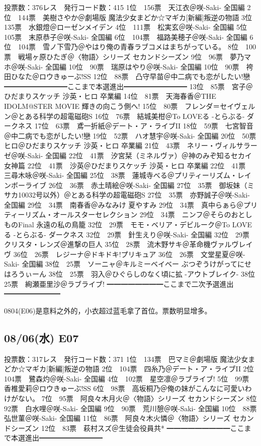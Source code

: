 	投票数：376レス　発行コード数：415
	1位　156票　天江衣＠咲-Saki- 全国編
	2位　144票　美樹さやか＠劇場版 魔法少女まどか☆マギカ[新編]叛逆の物語
	3位　135票　水銀燈＠ローゼンメイデン
	4位　111票　松実玄＠咲-Saki- 全国編
	5位　105票　末原恭子＠咲-Saki- 全国編
	6位　104票　福路美穂子＠咲-Saki- 全国編
	6位　104票　雪ノ下雪乃＠やはり俺の青春ラブコメはまちがっている。
	8位　100票　戦場ヶ原ひたぎ＠〈物語〉シリーズ セカンドシーズン
	9位　96票　夢乃マホ＠咲-Saki- 全国編
	10位　90票　瑞原はやり＠咲-Saki- 全国編
	10位　90票　袴田ひなた＠ロウきゅーぶ!SS
	12位　88票　凸守早苗＠中二病でも恋がしたい!戀
	━━━━━━━━━ここまで本選進出━━━━━━━━━
	13位　85票　宮子＠ひだまりスケッチ 沙英・ヒロ 卒業編
	14位　81票　天海春香＠THE IDOLM@STER MOVIE 輝きの向こう側へ!
	15位　80票　フレンダ＝セイヴェルン＠とある科学の超電磁砲S
	16位　76票　結城美柑＠To LOVEる -とらぶる- ダークネス
	17位　63票　鳶一折紙＠デート・ア・ライブII
	18位　59票　七宮智音＠中二病でも恋がしたい!戀
	19位　52票　ハオ慧宇＠咲-Saki- 全国編
	20位　50票　ヒロ＠ひだまりスケッチ 沙英・ヒロ 卒業編
	21位　43票　ネリー・ヴィルサラーゼ＠咲-Saki- 全国編
	22位　41票　汐宮栞（ミネルヴァ）＠神のみぞ知るセカイ 女神篇
	22位　41票　沙英＠ひだまりスケッチ 沙英・ヒロ 卒業編
	22位　41票　三尋木咏＠咲-Saki- 全国編
	25位　38票　蓮城寺べる＠プリティーリズム・レインボーライブ
	26位　36票　赤土晴絵＠咲-Saki- 全国編
	27位　35票　御坂妹（ミサカ10032号以外）＠とある科学の超電磁砲S
	27位　35票　亦野誠子＠咲-Saki- 全国編
	29位　34票　南春香＠みなみけ 夏やすみ
	29位　34票　真中らぁら＠プリティーリズム・オールスターセレクション
	29位　34票　ニンフ＠そらのおとしものFinal 永遠の私の鳥籠
	32位　29票　モモ・ベリア・デビルーク＠To LOVEる -とらぶる- ダークネス
	32位　29票　針生えり＠咲-Saki- 全国編
	32位　29票　クリスタ・レンズ＠進撃の巨人
	35位　28票　流木野サキ＠革命機ヴァルヴレイヴ
	36位　26票　レジーナ＠ドキドキ!プリキュア
	36位　26票　文堂星夏＠咲-Saki- 全国編
	38位　25票　ソーニャ＠キルミーベイベー ぶつぞうけがってにせはろうぃーん
	38位　25票　羽入＠ひぐらしのなく頃に拡 -アウトブレイク-
	38位　25票　絢瀬亜里沙＠ラブライブ!
	━━━━━━━━ここまで二次予選進出━━━━━━━━

0804(E06)是意料之外的，小衣超过蓝毛拿了首位。票数明显增多。

\subsection{08/06(水) E07}

	投票数：317レス　発行コード数：371
	1位　134票　巴マミ＠劇場版 魔法少女まどか☆マギカ[新編]叛逆の物語
	2位　104票　四糸乃＠デート・ア・ライブII
	2位　104票　鷺森灼＠咲-Saki- 全国編
	4位　102票　星空凛＠ラブライブ!
	5位　99票　香椎愛莉＠ロウきゅーぶ!SS
	6位　98票　高坂桐乃＠俺の妹がこんなに可愛いわけがない。
	7位　95票　阿良々木月火＠〈物語〉シリーズ セカンドシーズン
	8位　92票　白水哩＠咲-Saki- 全国編
	9位　90票　荒川憩＠咲-Saki- 全国編
	10位　88票　弘世菫＠咲-Saki- 全国編
	11位　86票　阿良々木火憐＠〈物語〉シリーズ セカンドシーズン
	12位　83票　萩村スズ＠生徒会役員共*
	━━━━━━━━━ここまで本選進出━━━━━━━━━

